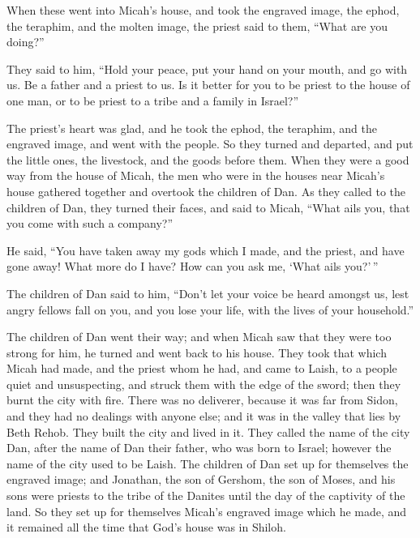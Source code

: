  When these went into Micah's house, and took the
engraved image, the ephod, the teraphim, and the molten image, the
priest said to them, ``What are you doing?''

 They said to him, ``Hold your peace, put your hand on
your mouth, and go with us. Be a father and a priest to us. Is it better
for you to be priest to the house of one man, or to be priest to a tribe
and a family in Israel?''

 The priest's heart was glad, and he took the ephod, the
teraphim, and the engraved image, and went with the people.
 So they turned and departed, and put the little ones,
the livestock, and the goods before them.  When they were
a good way from the house of Micah, the men who were in the houses near
Micah's house gathered together and overtook the children of Dan.
 As they called to the children of Dan, they turned their
faces, and said to Micah, ``What ails you, that you come with such a
company?''

 He said, ``You have taken away my gods which I made, and
the priest, and have gone away! What more do I have? How can you ask me,
`What ails you?'\,''

 The children of Dan said to him, ``Don't let your voice
be heard amongst us, lest angry fellows fall on you, and you lose your
life, with the lives of your household.''

 The children of Dan went their way; and when Micah saw
that they were too strong for him, he turned and went back to his house.
 They took that which Micah had made, and the priest whom
he had, and came to Laish, to a people quiet and unsuspecting, and
struck them with the edge of the sword; then they burnt the city with
fire.  There was no deliverer, because it was far from
Sidon, and they had no dealings with anyone else; and it was in the
valley that lies by Beth Rehob. They built the city and lived in it.
 They called the name of the city Dan, after the name of
Dan their father, who was born to Israel; however the name of the city
used to be Laish.  The children of Dan set up for
themselves the engraved image; and Jonathan, the son of Gershom, the son
of Moses, and his sons were priests to the tribe of the Danites until
the day of the captivity of the land.  So they set up for
themselves Micah's engraved image which he made, and it remained all the
time that God's house was in Shiloh.

